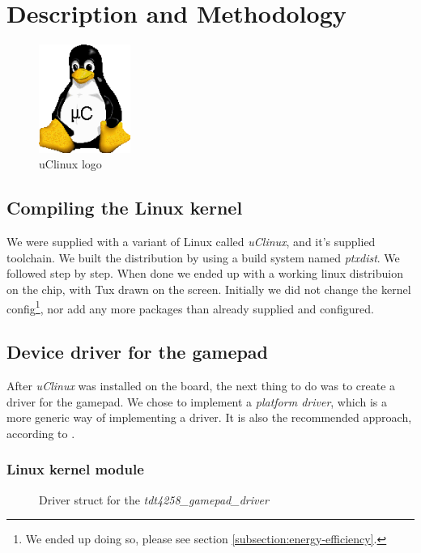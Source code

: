 \section{Description and Methodology}

\begin{figure}[h]
	\centering
	\includegraphics[width=3cm]{img/uclinux.png}
	\caption{uClinux logo}
	\label{fig:uclinux}
\end{figure}
\subsection{Compiling the Linux kernel}
We were supplied with a variant of Linux called \emph{uClinux}, and it's supplied toolchain. We built the distribution by using a build system named \emph{ptxdist}. We followed \cite[section 5.3]{compendium} step by step. When done we ended up with a working linux distribuion on the chip, with Tux drawn on the screen. Initially we did not change the kernel config\footnote{We ended up doing so, please see section \ref{subsection:energy-efficiency}.}, nor add any more packages than already supplied and configured.

\subsection{Device driver for the gamepad}
After \emph{uClinux} was installed on the board, the next thing to do was to create a driver for the gamepad. We chose to implement a \emph{platform driver}, which is a more generic way of implementing a driver. It is also the recommended approach, according to \cite{compendium}.
\subsubsection{Linux kernel module}

\begin{figure}[h]
	\centering
	
	\caption{Driver struct for the \emph{tdt4258\_gamepad\_driver}}
	\label{fig:tdt4258-gamepad-driver}
\end{figure}

